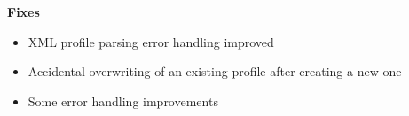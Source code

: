 \documentclass[a4, 10pt]{article}
\begin{document}
\noindent \textbf{Fixes}
\begin{itemize}
    \item XML profile parsing error handling improved
    \item Accidental overwriting of an existing profile after creating a
        new one
    \item Some error handling improvements
\end{itemize}



%
%
\end{document}
